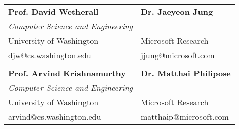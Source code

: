 \documentclass[margin,line]{res}
\begin{document}
\begin{resume}
\begin{tabular}{@{}p{3in}p{3in}}
{\bf Prof. David Wetherall} & {\bf Dr. Jaeyeon Jung} \\
{\em Computer Science and Engineering} & \\
University of Washington & Microsoft Research \\
{djw@cs.washington.edu} & {jjung@microsoft.com} \\
\\
{\bf Prof. Arvind Krishnamurthy} & {\bf Dr. Matthai Philipose} \\
{\em Computer Science and Engineering} &  \\
University of Washington & Microsoft Research \\
{arvind@cs.washington.edu} & {matthaip@microsoft.com}

\end{tabular}

\end{resume}
\end{document}

